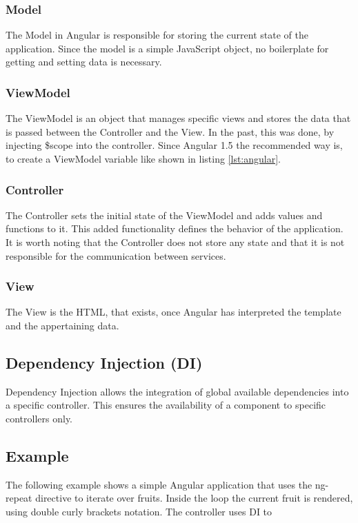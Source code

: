 \subsubsection{Model}
The Model in Angular is responsible for storing the current state of the application. Since the model is a simple JavaScript object, no boilerplate for getting and setting data is necessary.

\subsubsection{ViewModel}
The ViewModel is an object that manages specific views and stores the data that is passed between the Controller and the View. In the past, this was done, by injecting \$scope into the controller. Since Angular 1.5 the recommended way is, to create a ViewModel variable like shown in listing \ref{lst:angular}.

\subsubsection{Controller}
The Controller sets the initial state of the ViewModel and adds values and functions to it. This added functionality defines the behavior of the application. It is worth noting that the Controller does not store any state and that it is not responsible for the communication between services.

\subsubsection{View}
The View is the HTML, that exists, once Angular has interpreted the template and the appertaining data.

\subsection{Dependency Injection (DI)}
Dependency Injection allows the integration of global available dependencies into a specific controller. This ensures the availability of a component to specific controllers only.\\


\subsection{Example}
The following example shows a simple Angular application that uses the ng-repeat directive to iterate over fruits. Inside the loop the current fruit is rendered, using double curly brackets notation. The controller uses DI to 


